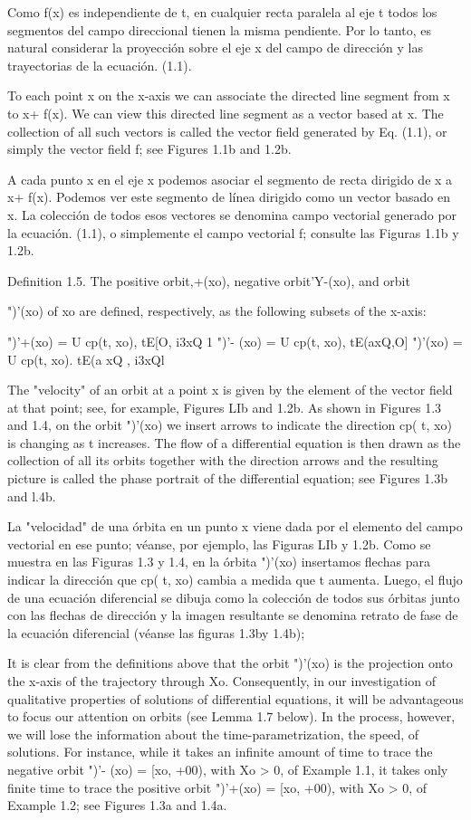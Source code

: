 \documentclass[]{article}
\begin{document}
{Como f(x) es independiente de t, en cualquier recta paralela al eje t todos los segmentos del campo direccional tienen la misma pendiente. Por lo tanto, es natural considerar la proyección sobre el eje x del campo de dirección y las trayectorias de la ecuación. (1.1).

To each point x on the x-axis we can associate the directed line segment from x to x+ f(x). We can view this directed line segment as a vector based at x. The collection of all such vectors is called the vector field generated by Eq. (1.1), or simply the vector field f; see Figures 1.1b and 1.2b.

A cada punto x en el eje x podemos asociar el segmento de recta dirigido de x a x+ f(x). Podemos ver este segmento de línea dirigido como un vector basado en x. La colección de todos esos vectores se denomina campo vectorial generado por la ecuación. (1.1), o simplemente el campo vectorial f; consulte las Figuras 1.1b y 1.2b.

Definition 1.5. The positive orbit,+(xo), negative orbit'Y-(xo), and orbit



")'(xo) of xo are defined, respectively, as the following subsets of the x-axis:

")'+(xo) = U cp(t, xo),
tE[O, i3xQ 1
")'- (xo) = U cp(t, xo),
tE(axQ,O]
")'(xo) = U cp(t, xo).
tE(a xQ , i3xQl

The "velocity" of an orbit at a point x is given by the element of the vector field at that point; see, for example, Figures LIb and 1.2b. As shown in Figures 1.3 and 1.4, on the orbit ")'(xo) we insert arrows to indicate the direction cp( t, xo) is changing as t increases. The flow of a differential equation is then drawn as the collection of all its orbits together with the direction arrows and the resulting picture is called the phase portrait of the differential equation; see Figures 1.3b and l.4b.

La "velocidad" de una órbita en un punto x viene dada por el elemento del campo vectorial en ese punto; véanse, por ejemplo, las Figuras LIb y 1.2b. Como se muestra en las Figuras 1.3 y 1.4, en la órbita ")'(xo) insertamos flechas para indicar la dirección que cp( t, xo) cambia a medida que t aumenta. Luego, el flujo de una ecuación diferencial se dibuja como la colección de todos sus órbitas junto con las flechas de dirección y la imagen resultante se denomina retrato de fase de la ecuación diferencial (véanse las figuras 1.3by 1.4b);

It is clear from the definitions above that the orbit ")'(xo) is the projection onto the x-axis of the trajectory through Xo. Consequently, in our investigation of qualitative properties of solutions of differential equations, it will be advantageous to focus our attention on orbits (see Lemma 1.7 below). In the process, however, we will lose the information about the time-parametrization, the speed, of solutions. For instance, while it takes an infinite amount of time to trace the negative orbit ")'- (xo) = [xo, +00), with Xo > 0, of Example 1.1, it takes only finite time to trace the positive orbit ")'+(xo) = [xo, +00), with Xo > 0, of Example 1.2; see Figures 1.3a and 1.4a.

}
\end{document}

